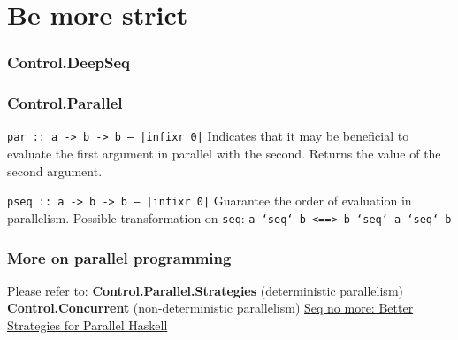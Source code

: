 \documentclass{beamer}
\newcommand{\inlinehaskell}[1]{\texttt{#1}}
\begin{document}
\section{Be more strict}



\begin{frame}
\frametitle{Control.DeepSeq}
\end{frame}


\begin{frame}
\frametitle{Control.Parallel}
\inlinehaskell{par :: a -> b -> b  -- |infixr 0|}\newline
Indicates that it may be beneficial to evaluate the first argument in parallel with the second. Returns the value of the second argument.\newline

\inlinehaskell{pseq :: a -> b -> b   -- |infixr 0|}\newline
Guarantee the order of evaluation in parallelism.\newline
\newline\pause
Possible transformation on \inlinehaskell{seq}:\newline
\inlinehaskell{a `seq` b <==> b `seq` a `seq` b}
\end{frame}


\begin{frame}
\frametitle{More on parallel programming}
Please refer to:\newline\newline
\textbf{Control.Parallel.Strategies} (deterministic parallelism)\newline\newline
\textbf{Control.Concurrent} (non-deterministic parallelism)\newline\newline
\href{http://simonmar.github.io/bib/papers/strategies.pdf}{Seq no more: Better Strategies for Parallel Haskell}
\end{frame}
\end{document}
